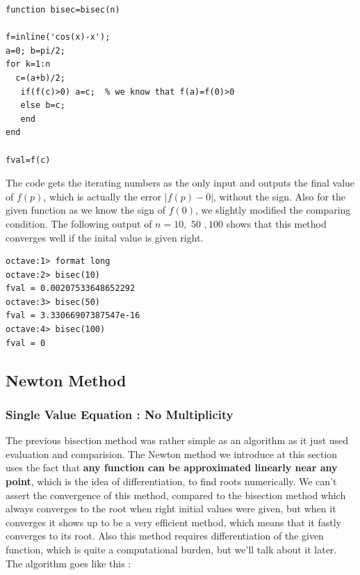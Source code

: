 \documentclass[paper=a4, fontsize=11pt]{scrartcl}
\begin{document}
\begin{lstlisting}[label=test.m,caption=bisec.m]
function bisec=bisec(n)

f=inline('cos(x)-x');
a=0; b=pi/2;
for k=1:n
  c=(a+b)/2;
   if(f(c)>0) a=c;  % we know that f(a)=f(0)>0 
   else b=c;
   end
end

fval=f(c)
\end{lstlisting}
\vspace{0.15in}

The code gets the iterating numbers as the only input and outputs the final value of $f(p)$, which is actually the error $|f(p)-0|$, without the sign. Also for the given function as we know the sign of $f(0)$, we slightly modified the comparing condition. The following output of $n=10,$ $50$ $,100$ shows that this method converges well if the inital value is given right.

\begin{verbatim}
octave:1> format long
octave:2> bisec(10)
fval = 0.00207533648652292
octave:3> bisec(50)
fval = 3.33066907387547e-16
octave:4> bisec(100)
fval = 0
\end{verbatim}


\subsection{Newton Method}
\vspace{0.15in}
\subsubsection{Single Value Equation : No Multiplicity}
\vspace{0.15in}
The previous bisection method was rather simple as an algorithm as it just used evaluation and comparision. The Newton method we introduce at this section uses the fact that \textbf{any function can be approximated linearly near any point}, which is the idea of differentiation, to find roots numerically. We can't assert the convergence of this method, compared to the bisection method which always converges to the root when right initial values were given, but when it converges it shows up to be a very efficient method, which means that it fastly converges to its root. Also this method requires differentiation of the given function, which is quite a computational burden, but we'll talk about it later. The algorithm goes like this :
\vspace{0.15in}
\end{document}
